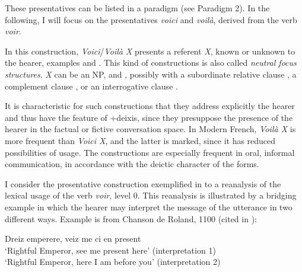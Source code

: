 \documentclass[output=paper]{langsci/langscibook}
\begin{document}
These presentatives can be listed in a paradigm (see Paradigm 2). In the following, I will focus on the presentatives \textit{voici} and \textit{voilà}, derived from the verb \textit{voir}.

In this construction, \textit{Voici}/\textit{Voilà X} presents a referent \textit{X}, known or unknown to the hearer, examples  and . This kind of constructions is also called \textit{neutral focus structures}. \textit{X} can be an NP,  and , possibly with a subordinate relative clause , a complement clause , or an interrogative clause .

It is characteristic for such constructions that they address explicitly the hearer and thus have the feature of +deixis, since they presuppose the presence of the hearer in the factual or fictive conversation space. In Modern French, \textit{Voilà X} is more frequent than \textit{Voici X}, and the latter is marked, since it has reduced possibilities of usage. The constructions are especially frequent in oral, informal communication, in accordance with the deictic character of the forms.

I consider the presentative construction exemplified in  to  a reanalysis of the lexical usage of the verb \textit{voir}, level 0. This reanalysis is illustrated by a bridging example  in which the hearer may interpret the message of the utterance in two different ways. Example  is from Chanson de Roland, 1100 (cited in \citealt[79]{OppermannMarsaux2006}):

\begin{exe}
    \ex \label{ex:kragh:21} Dreiz emperere, veiz me ci en present\\
    ‘Rightful Emperor, see me present here' (interpretation 1)\\
    `Rightful Emperor, here I am before you' (interpretation 2)
\end{exe}
\end{document}
